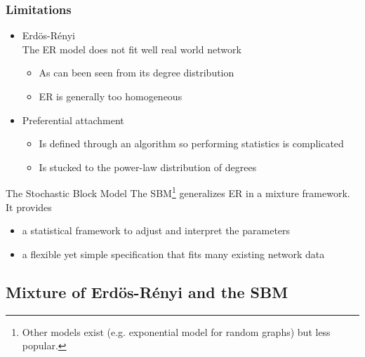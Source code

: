 \documentclass{beamer}\usepackage[]{graphicx}\usepackage[]{color}
\begin{document}
\begin{frame}
  \frametitle{Limitations}

    \begin{itemize}
    \item \alert{Erdös-Rényi}\\
      The ER model does not fit well real world network
      \begin{itemize}
        \item As can been seen from its degree distribution
        \item ER is generally too homogeneous
      \end{itemize}
    \item \alert{Preferential attachment}
      \begin{itemize}
        \item Is defined through an algorithm so performing statistics is complicated
        \item Is stucked to the power-law distribution of degrees
      \end{itemize}
    \end{itemize}

  \vfill

  \begin{block}{The Stochastic Block Model}
    The SBM\footnote{Other models exist (e.g. exponential model for random graphs) but less popular.} generalizes ER in a mixture framework. It provides
    \begin{itemize}
      \item a statistical framework to adjust and interpret the parameters
      \item a flexible yet simple specification that fits many existing network data
    \end{itemize}
  \end{block}

\end{frame}


\subsection{Mixture of Erdös-Rényi and the SBM}
\end{document}
